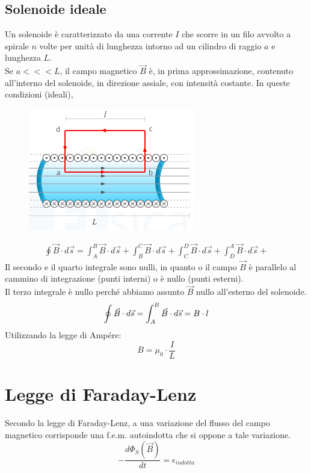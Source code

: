 \subsection{Solenoide ideale}
Un solenoide è caratterizzato da una corrente $I$ che scorre in un filo avvolto a spirale $n$ volte per unità di lunghezza intorno ad un cilindro di raggio $a$ e lunghezza $L$.\\
Se $a <<< L$, il campo magnetico $\vec{B}$ è, in prima approssimazione, contenuto all'interno del solenoide, in direzione assiale, con intensità costante. In queste condizioni (ideali),  
\begin{figure}[h!]
	\centering
	\includegraphics[scale=3]{solenoide-ampere.png}
\end{figure}
\begin{displaymath}\begin{aligned}
	\oint \vec{B} \cdot d\vec{s} = \int_A^B \vec{B} \cdot d\vec{s} + \int_B^C \vec{B} \cdot d\vec{s} + \int_C^D \vec{B} \cdot d\vec{s} + \int_D^A \vec{B} \cdot d\vec{s} + 
\end{aligned}\end{displaymath}
Il secondo e il quarto integrale sono nulli, in quanto o il campo $\vec{B}$ è parallelo al cammino di integrazione (punti interni) o è nullo (punti esterni).\\
Il terzo integrale è nullo perché abbiamo assunto $\vec{B}$ nullo all'esterno del solenoide.
\begin{displaymath}
	\oint \vec{B} \cdot d\vec{s} = \int_A^B \vec{B} \cdot d\vec{s} = B \cdot l\\
\end{displaymath}
Utilizzando la legge di Ampére:
\begin{displaymath}
	B = \mu_0 \cdot \frac{I}{L}
\end{displaymath}

\section{Legge di Faraday-Lenz}
Secondo la legge di Faraday-Lenz, a una variazione del flusso del campo magnetico corrisponde una f.e.m. autoindotta che si oppone a tale variazione.
\begin{displaymath}
	- \frac{d\Phi_S (\vec{B})}{dt} = \epsilon_{indotta}
\end{displaymath}


